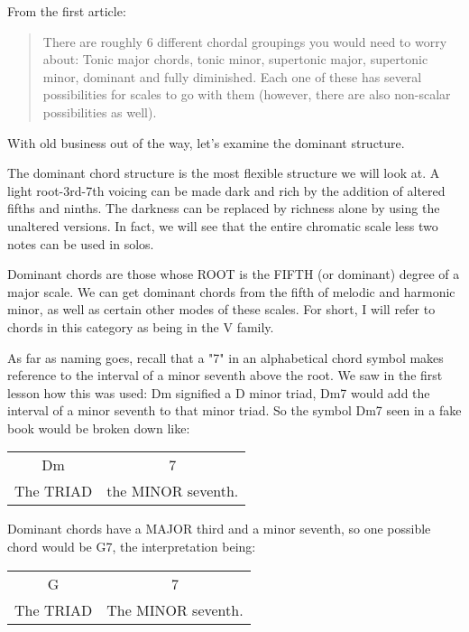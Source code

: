 From the first article:
\begin{quote}
There are roughly 6 different chordal groupings you would need to worry about:
Tonic major chords, tonic minor, supertonic major, supertonic minor, dominant
and fully diminished. Each one of these has several possibilities for scales
to go with them (however, there are also non-scalar possibilities as well).
\end{quote}

With old business out of the way, let's examine the dominant structure.

The dominant chord structure is the most flexible structure we will look at.
A light root-3rd-7th voicing can be made dark and rich by the addition of
altered fifths and ninths. The darkness can be replaced by richness alone by
using the unaltered versions. In fact, we will see that the entire chromatic
scale less two notes can be used in solos.

Dominant chords are those whose ROOT is the FIFTH (or dominant) degree of
a major scale. We can get dominant chords from the fifth of melodic and
harmonic minor, as well as certain other modes of these scales. For short,
I will refer to chords in this category as being in the V family.

As far as naming goes, recall that a "7" in an alphabetical chord symbol
makes reference to the interval of a minor seventh above the root. We saw
in the first lesson how this was used: Dm signified a D minor triad, Dm7
would add the interval of a minor seventh to that minor triad. So the
symbol Dm7 seen in a fake book would be broken down like: 

\begin{center}
\begin{tabular}{ c c }
  Dm          & 7\\
  The TRIAD   & the MINOR seventh.\\
\end{tabular}
\end{center}%

Dominant chords have a MAJOR third and a minor seventh, so one possible
chord would be G7, the interpretation being:

\begin{center}
\begin{tabular}{ c c }
  G           & 7\\
  The TRIAD   & The MINOR seventh.\\
\end{tabular}
\end{center}

